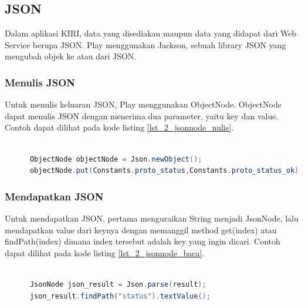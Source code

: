 \subsection{JSON}
Dalam aplikasi KIRI, data yang disediakan maupun data yang didapat dari Web Service berupa JSON. Play menggunakan Jackson, sebuah library JSON yang mengubah objek ke atau dari JSON.

\subsubsection{Menulis JSON}
Untuk menulis keluaran JSON, Play menggunakan ObjectNode. ObjectNode dapat menulis JSON dengan menerima dua parameter, yaitu key dan value. Contoh dapat dilihat pada kode listing \ref{lst_2_jsonnode_nulis}.

\begin{lstlisting}[caption=Contoh menulis JSON menggunakan ObjectNode,label = {lst_2_jsonnode_nulis},language=Java]
	
      ObjectNode objectNode = Json.newObject();
      objectNode.put(Constants.proto_status,Constants.proto_status_ok);
\end{lstlisting}

 

\subsubsection{Mendapatkan JSON}
Untuk mendapatkan JSON, pertama menguraikan String menjadi JsonNode, lalu mendapatkan value dari keynya dengan memanggil method get(index) atau findPath(index) dimana index tersebut adalah key yang ingin dicari. Contoh dapat dilihat pada kode listing \ref{lst_2_jsonnode_baca}.

\begin{lstlisting}[caption=Contoh mendapatkan JSON menggunakan JsonNode,label = {lst_2_jsonnode_baca},language=Java]
	
      JsonNode json_result = Json.parse(result);
      json_result.findPath("status").textValue();
\end{lstlisting} 

